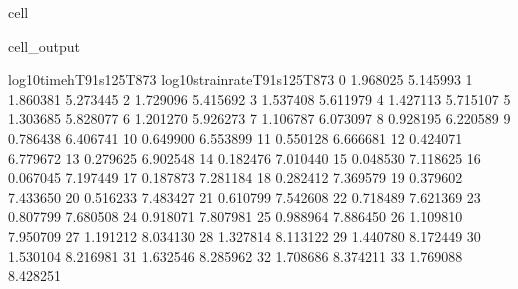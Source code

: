 \documentclass[letterpaper,10pt,english]{jupyterBook}
\begin{document}
\begin{sphinxuseclass}{cell}
\begin{sphinxVerbatimOutput}
\begin{sphinxuseclass}{cell_output}
\begin{sphinxVerbatim}[commandchars=\\\{\}]
					log10timeh\PYGZus{}T91s125T873  log10strainrate\PYGZus{}T91s125T873  \PYGZbs{}
					0                \PYGZhy{}1.968025                    \PYGZhy{}5.145993   
					1                \PYGZhy{}1.860381                    \PYGZhy{}5.273445   
					2                \PYGZhy{}1.729096                    \PYGZhy{}5.415692   
					3                \PYGZhy{}1.537408                    \PYGZhy{}5.611979   
					4                \PYGZhy{}1.427113                    \PYGZhy{}5.715107   
					5                \PYGZhy{}1.303685                    \PYGZhy{}5.828077   
					6                \PYGZhy{}1.201270                    \PYGZhy{}5.926273   
					7                \PYGZhy{}1.106787                    \PYGZhy{}6.073097   
					8                \PYGZhy{}0.928195                    \PYGZhy{}6.220589   
					9                \PYGZhy{}0.786438                    \PYGZhy{}6.406741   
					10               \PYGZhy{}0.649900                    \PYGZhy{}6.553899   
					11               \PYGZhy{}0.550128                    \PYGZhy{}6.666681   
					12               \PYGZhy{}0.424071                    \PYGZhy{}6.779672   
					13               \PYGZhy{}0.279625                    \PYGZhy{}6.902548   
					14               \PYGZhy{}0.182476                    \PYGZhy{}7.010440   
					15               \PYGZhy{}0.048530                    \PYGZhy{}7.118625   
					16                0.067045                    \PYGZhy{}7.197449   
					17                0.187873                    \PYGZhy{}7.281184   
					18                0.282412                    \PYGZhy{}7.369579   
					19                0.379602                    \PYGZhy{}7.433650   
					20                0.516233                    \PYGZhy{}7.483427   
					21                0.610799                    \PYGZhy{}7.542608   
					22                0.718489                    \PYGZhy{}7.621369   
					23                0.807799                    \PYGZhy{}7.680508   
					24                0.918071                    \PYGZhy{}7.807981   
					25                0.988964                    \PYGZhy{}7.886450   
					26                1.109810                    \PYGZhy{}7.950709   
					27                1.191212                    \PYGZhy{}8.034130   
					28                1.327814                    \PYGZhy{}8.113122   
					29                1.440780                    \PYGZhy{}8.172449   
					30                1.530104                    \PYGZhy{}8.216981   
					31                1.632546                    \PYGZhy{}8.285962   
					32                1.708686                    \PYGZhy{}8.374211   
					33                1.769088                    \PYGZhy{}8.428251   

\end{sphinxVerbatim}
\end{sphinxuseclass}
\end{sphinxVerbatimOutput}
\end{sphinxuseclass}
\end{document}
